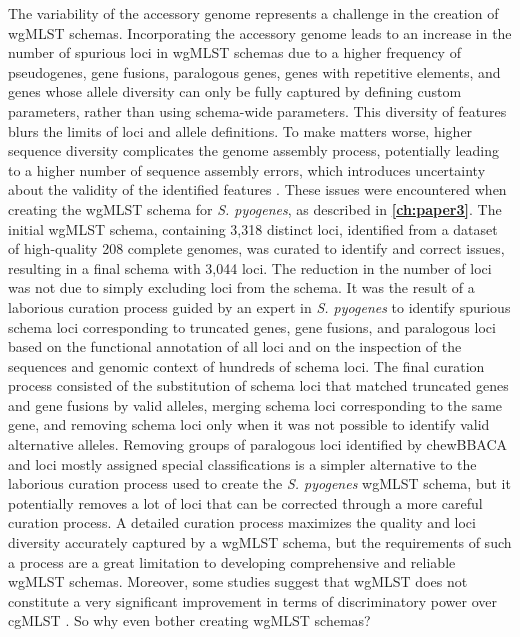 The variability of the accessory genome represents a challenge in the creation of \ac{wgMLST} schemas. Incorporating the accessory genome leads to an increase in the number of spurious loci in \ac{wgMLST} schemas due to a higher frequency of pseudogenes, gene fusions, paralogous genes, genes with repetitive elements, and genes whose allele diversity can only be fully captured by defining custom parameters, rather than using schema-wide parameters.
This diversity of features blurs the limits of loci and allele definitions. To make matters worse, higher sequence diversity complicates the genome assembly process, potentially leading to a higher number of sequence assembly errors, which introduces uncertainty about the validity of the identified features \cite{}. These issues were encountered when creating the \ac{wgMLST} schema for \textit{S. pyogenes}, as described in \textbf{\autoref{ch:paper3}}. The initial \ac{wgMLST} schema, containing 3,318 distinct loci, identified from a dataset of high-quality 208 complete genomes, was curated to identify and correct issues, resulting in a final schema with 3,044 loci. The reduction in the number of loci was not due to simply excluding loci from the schema. It was the result of a laborious curation process guided by an expert in \textit{S. pyogenes} to identify spurious schema loci corresponding to truncated genes, gene fusions, and paralogous loci based on the functional annotation of all loci and on the inspection of the sequences and genomic context of hundreds of schema loci. The final curation process consisted of the substitution of schema loci that matched truncated genes and gene fusions by valid alleles, merging schema loci corresponding to the same gene, and removing schema loci only when it was not possible to identify valid alternative alleles. Removing groups of paralogous loci identified by chewBBACA and loci mostly assigned special classifications is a simpler alternative to the laborious curation process used to create the \textit{S. pyogenes} \ac{wgMLST} schema, but it potentially removes a lot of loci that can be corrected through a more careful curation process. A detailed curation process maximizes the quality and loci diversity accurately captured by a \ac{wgMLST} schema, but the requirements of such a process are a great limitation to developing comprehensive and reliable \ac{wgMLST} schemas. Moreover, some studies suggest that \ac{wgMLST} does not constitute a very significant improvement in terms of discriminatory power over \ac{cgMLST} \cite{uelze_typing_2020, henri_assessment_2017, pearce_comparative_2018, vincent_comparison_2018, joseph_evaluation_2023, blanc_comparison_2020, baktash_comparison_nodate, king_comparison_2024}. So why even bother creating \ac{wgMLST} schemas?

